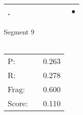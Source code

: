 \documentclass[landscape]{article}
\newcommand{\ssp}{\hspace{2pt}}
\newcommand{\mex}{\cellcolor{g}$\bullet$}
\begin{document}
\begin{tabular}{|l|p{10pt}|p{10pt}|p{10pt}|p{10pt}|p{10pt}|p{10pt}|p{10pt}|p{10pt}|}
\hline
\ssp \cellcolor{ref7}. \ssp&\hspace{2pt}&\hspace{2pt}&\hspace{2pt}&\hspace{2pt}&\hspace{2pt}&\hspace{2pt}&\hspace{2pt}&\hspace{2pt}\mex\\
\hline
\end{tabular}

\vspace{6pt}
\noindent Segment 9\\\\
\noindent\begin{tabular}{lm{12pt}r}
\hline
P:&&0.263\\
R:&&0.278\\
Frag:&&0.600\\
Score:&&0.110\\
\end{tabular}

\newpage
\end{document}
